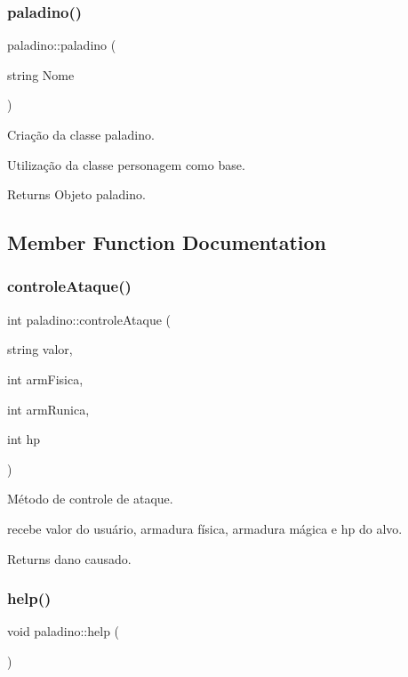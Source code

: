 \subsubsection{\texorpdfstring{paladino()}{paladino()}}
{\footnotesize\ttfamily paladino\+::paladino (\begin{DoxyParamCaption}\item[{string}]{Nome }\end{DoxyParamCaption})}



Criação da classe paladino. 

Utilização da classe personagem como base. \begin{DoxyReturn}{Returns}
Objeto paladino. 
\end{DoxyReturn}


\subsection{Member Function Documentation}
\mbox{\label{classpaladino_a059fd05922c2adcbd87743b9c3552c11}} 
\subsubsection{\texorpdfstring{controle\+Ataque()}{controleAtaque()}}
{\footnotesize\ttfamily int paladino\+::controle\+Ataque (\begin{DoxyParamCaption}\item[{string}]{valor,  }\item[{int}]{arm\+Fisica,  }\item[{int}]{arm\+Runica,  }\item[{int}]{hp }\end{DoxyParamCaption})}



Método de controle de ataque. 

recebe valor do usuário, armadura física, armadura mágica e hp do alvo. \begin{DoxyReturn}{Returns}
dano causado. 
\end{DoxyReturn}
\mbox{\label{classpaladino_a028019d72c919de0589cccdfed402a18}} 
\subsubsection{\texorpdfstring{help()}{help()}}
{\footnotesize\ttfamily void paladino\+::help (\begin{DoxyParamCaption}{ }\end{DoxyParamCaption})}



